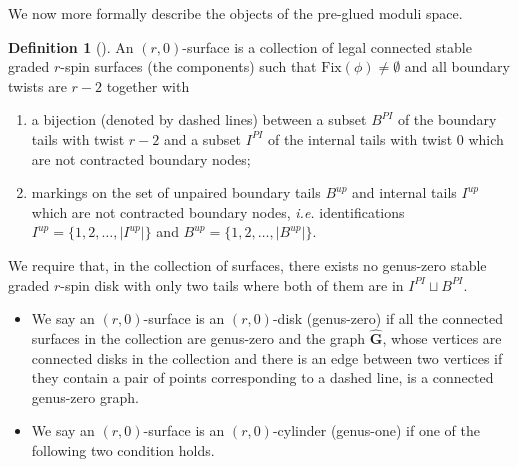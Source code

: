 \documentclass[11pt]{amsart}
\theoremstyle{definition}
\newtheorem{dfn}[dummy]{Definition}
\theoremstyle{remark}
\newcommand{\<}{\left<}
\renewcommand{\>}{\right>}
\numberwithin{equation}{section}
\begin{document}
We now more formally describe the %
objects of the pre-glued moduli space.
\begin{dfn}[{\cite[Definition 4.3]{TZ1}}]\label{dfn rh disk}
    An $(r,0)$-surface is a collection of legal connected  stable graded $r$-spin surfaces (the components) such that $\text{Fix}(\phi)\ne \emptyset$ and all boundary twists are %
$r-2$ together %
with
    \begin{enumerate}
        \item a bijection (denoted by dashed lines) between a subset $B^{PI}$ of the boundary tails with twist $r-2$ and a subset $I^{PI}$ of the internal tails with twist $0$ which are not contracted boundary nodes;
        \item markings on the set of unpaired boundary tails $B^{up}$ and internal tails $I^{up}$ which are not contracted boundary %
nodes, \textit{i.e.} identifications %
$I^{up}=\{1,2,\dots,\lvert I^{up}\rvert\}$ and $B^{up}=\{1,2,\dots,\lvert B^{up}\rvert\}$.
    \end{enumerate}
    We require that, in the collection of surfaces, there exists no genus-zero stable graded $r$-spin disk with only %
two tails where %
both of them are in $I^{PI}\sqcup B^{PI}$.
    \begin{itemize}
        \item  We say an $(r,0)$-surface is an $(r,0)$-disk (genus-zero) if all %
the connected surfaces %
in the collection %
are genus-zero and %
the graph $\hat{\mathbf{G}}$, whose vertices are connected disks in the collection and there is an edge between two vertices if they contain a pair of points corresponding to a dashed line, is a connected genus-zero graph.
        \item  We say an $(r,0)$-surface is an $(r,0)$-cylinder (genus-one) if one of the following two condition holds. 

\end{itemize}
\end{dfn}
\end{document}
